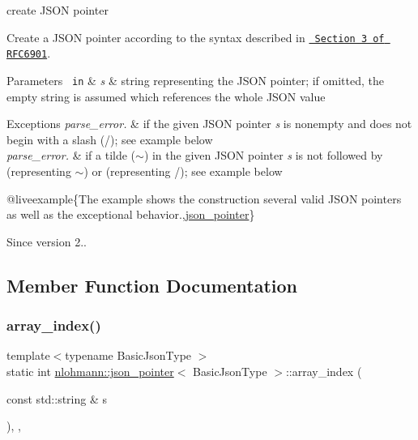 create J\+S\+ON pointer 

Create a J\+S\+ON pointer according to the syntax described in \href{https://tools.ietf.org/html/rfc6901\#section-3}{\texttt{ Section 3 of R\+F\+C6901}}.


\begin{DoxyParams}[1]{Parameters}
\mbox{\texttt{ in}}  & {\em s} & string representing the J\+S\+ON pointer; if omitted, the empty string is assumed which references the whole J\+S\+ON value\\
\hline
\end{DoxyParams}

\begin{DoxyExceptions}{Exceptions}
{\em parse\+\_\+error.} & if the given J\+S\+ON pointer {\itshape s} is nonempty and does not begin with a slash ({\ttfamily /}); see example below\\
\hline
{\em parse\+\_\+error.} & if a tilde ({\ttfamily $\sim$}) in the given J\+S\+ON pointer {\itshape s} is not followed by {} (representing {\ttfamily $\sim$}) or {} (representing {\ttfamily /}); see example below\\
\hline
\end{DoxyExceptions}
@liveexample\{The example shows the construction several valid J\+S\+ON pointers as well as the exceptional behavior.,\mbox{\hyperlink{classnlohmann_1_1json__pointer}{json\+\_\+pointer}}\}

\begin{DoxySince}{Since}
version 2.. 
\end{DoxySince}


\subsection{Member Function Documentation}
\mbox{\label{classnlohmann_1_1json__pointer_ac53f5b79dd91da78743c437832f57ce4}} 
\subsubsection{\texorpdfstring{array\_index()}{array\_index()}}
{\footnotesize\ttfamily template$<$typename Basic\+Json\+Type $>$ \\
static int \mbox{\hyperlink{classnlohmann_1_1json__pointer}{nlohmann\+::json\+\_\+pointer}}$<$ Basic\+Json\+Type $>$\+::array\+\_\+index (\begin{DoxyParamCaption}\item[{const std\+::string \&}]{s }\end{DoxyParamCaption})\hspace{0.3cm}{\ttfamily [inline]}, {\ttfamily [static]}, {\ttfamily [private]}}


